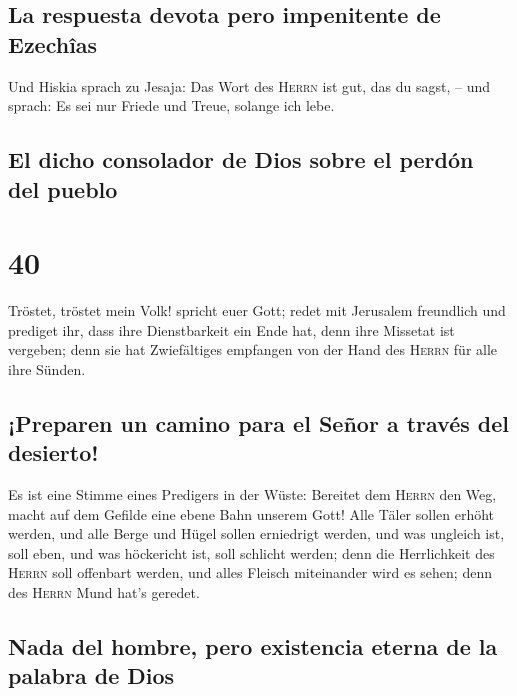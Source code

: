 \hypertarget{la-respuesta-devota-pero-impenitente-de-ezechuxeeas}{%
\subsection{La respuesta devota pero impenitente de
Ezechîas}\label{la-respuesta-devota-pero-impenitente-de-ezechuxeeas}}

 Und Hiskia sprach zu Jesaja: Das Wort des \textsc{Herrn}
ist gut, das du sagst, -- und sprach: Es sei nur Friede und Treue,
solange ich lebe.

\hypertarget{el-dicho-consolador-de-dios-sobre-el-perduxf3n-del-pueblo}{%
\subsection{El dicho consolador de Dios sobre el perdón del
pueblo}\label{el-dicho-consolador-de-dios-sobre-el-perduxf3n-del-pueblo}}

\hypertarget{section-39}{%
\section{40}\label{section-39}}

 Tröstet, tröstet mein Volk! spricht euer Gott;
 redet mit Jerusalem freundlich und prediget ihr, dass
ihre Dienstbarkeit ein Ende hat, denn ihre Missetat ist vergeben; denn
sie hat Zwiefältiges empfangen von der Hand des \textsc{Herrn} für alle
ihre Sünden.

\hypertarget{preparen-un-camino-para-el-seuxf1or-a-travuxe9s-del-desierto}{%
\subsection{¡Preparen un camino para el Señor a través del
desierto!}\label{preparen-un-camino-para-el-seuxf1or-a-travuxe9s-del-desierto}}

 Es ist eine Stimme eines Predigers in der Wüste: Bereitet
dem \textsc{Herrn} den Weg, macht auf dem Gefilde eine ebene Bahn
unserem Gott!  Alle Täler sollen erhöht werden, und alle
Berge und Hügel sollen erniedrigt werden, und was ungleich ist, soll
eben, und was höckericht ist, soll schlicht werden;  denn
die Herrlichkeit des \textsc{Herrn} soll offenbart werden, und alles
Fleisch miteinander wird es sehen; denn des \textsc{Herrn} Mund hat's
geredet.

\hypertarget{nada-del-hombre-pero-existencia-eterna-de-la-palabra-de-dios}{%
\subsection{Nada del hombre, pero existencia eterna de la palabra de
Dios}\label{nada-del-hombre-pero-existencia-eterna-de-la-palabra-de-dios}}

